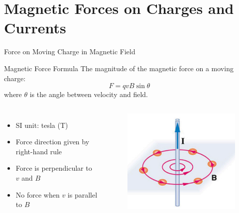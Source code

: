 \documentclass{beamer}
\begin{document}
\section{Magnetic Forces on Charges and Currents}

\begin{frame}{Force on Moving Charge in Magnetic Field}
\begin{block}{Magnetic Force Formula}
The magnitude of the magnetic force on a moving charge:
\begin{equation}
F = qvB\sin\theta
\end{equation}
where $\theta$ is the angle between velocity and field.
\end{block}

\begin{columns}
\begin{itemize}
\item SI unit: tesla (T)
\item Force direction given by right-hand rule
\item Force is perpendicular to $v$ and $B$
\item No force when $v$ is parallel to $B$
\end{itemize}

\begin{figure}
\centering
\includegraphics[width=0.75\linewidth]{phys12-magnetism-magnetic-field-lines-generator.png}
\end{figure}
\end{columns}
\end{frame}
\end{document}
